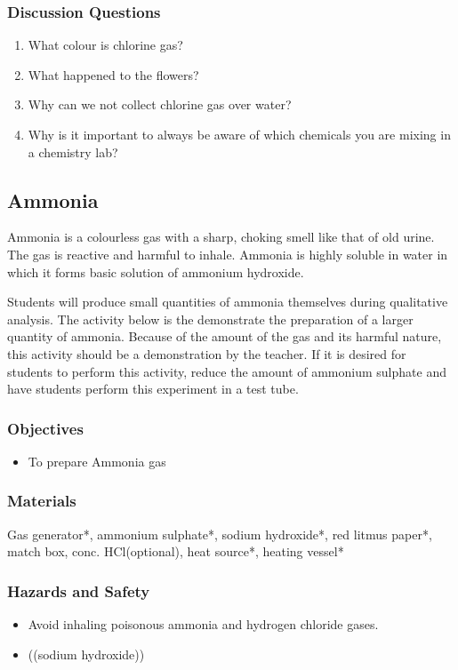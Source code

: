 \subsubsection*{Discussion Questions}
\begin{enumerate}
\item{What colour is chlorine gas?}
\item{What happened to the flowers?}
\item{Why can we not collect chlorine gas over water?}
\item{Why is it important to always be aware of which chemicals you are mixing in a chemistry lab?}
\end{enumerate}

\subsection{Ammonia}

Ammonia is a colourless gas with a sharp, choking smell like that of old urine. The gas is reactive and harmful to inhale. Ammonia is highly soluble in water in which it forms basic solution of ammonium hydroxide.

Students will produce small quantities of ammonia themselves during qualitative analysis. The activity below is the demonstrate the preparation of a larger quantity of ammonia. Because of the amount of the gas and its harmful nature, this activity should be a demonstration by the teacher. If it is desired for students to perform this activity, reduce the amount of ammonium sulphate and have students perform this experiment in a test tube.

\subsubsection*{Objectives}
\begin{itemize}
\item{To prepare Ammonia gas}
\end{itemize}

\subsubsection*{Materials}
Gas generator*, ammonium sulphate*, sodium hydroxide*, red litmus paper*, match box, conc. HCl(optional), heat source*, heating vessel*

\subsubsection*{Hazards and Safety}
\begin{itemize}
\item{Avoid inhaling poisonous ammonia and hydrogen chloride gases.}
\item{((sodium hydroxide))}
\end{itemize}

